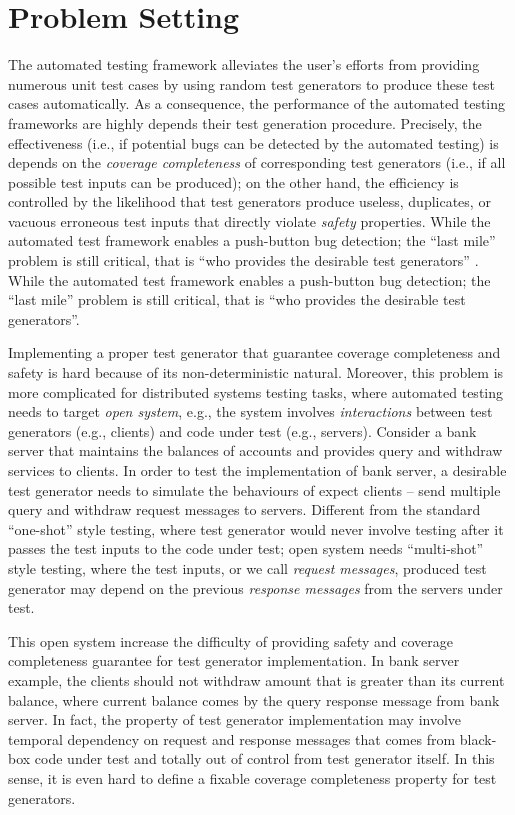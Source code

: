 \section{Problem Setting}

The automated testing framework alleviates the user's efforts from providing numerous unit test cases by using random test generators to produce these test cases automatically. 
As a consequence, the performance of the automated testing frameworks are highly depends their test generation procedure\cite{?}. Precisely, the effectiveness (i.e., if potential bugs can be detected by the automated testing) is depends on the \emph{coverage completeness} of corresponding test generators (i.e., if all possible test inputs can be produced); on the other hand, the efficiency is controlled by the likelihood that test generators produce useless, duplicates, or vacuous erroneous test inputs that directly violate \emph{safety} properties. While the automated test framework enables a push-button bug detection; the ``last mile'' problem is still critical, that is ``who provides the desirable test generators'' . While the automated test framework enables a push-button bug detection; the ``last mile'' problem is still critical, that is ``who provides the desirable test generators''. 

Implementing a proper test generator that guarantee coverage completeness and safety is hard because of its non-deterministic natural. Moreover, this problem is more complicated for distributed systems testing tasks, where automated testing needs to target \emph{open system}, e.g., the system involves \emph{interactions} between test generators (e.g., clients) and code under test (e.g., servers). Consider a bank server that maintains the balances of accounts and provides query and withdraw services to clients. In order to test the implementation of bank server, a desirable test generator needs to simulate the behaviours of expect clients -- send multiple query and withdraw request messages to servers.
Different from the standard ``one-shot'' style testing, where test generator would never involve testing after it passes the test inputs to the code under test; open system needs ``multi-shot'' style testing, where the test inputs, or we call \emph{request messages}, produced test generator may depend on the previous \emph{response messages} from the servers under test.

This open system increase the difficulty of providing safety and coverage completeness guarantee for test generator implementation. In bank server example, the clients should not withdraw amount that is greater than its current balance, where current balance comes by the query response message from bank server. In fact, the property of test generator implementation may involve temporal dependency on request and response messages that comes from black-box code under test and totally out of control from test generator itself. In this sense, it is even hard to define a fixable coverage completeness property for test generators.

